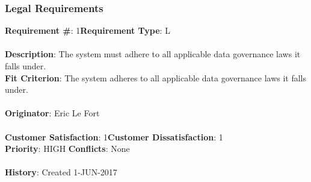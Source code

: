 \documentclass[titlepage]{article}
\begin{document}
\subsubsection{Legal Requirements}
\begin{framed}
	\noindent\textbf{Requirement \#}: 1\hfill \textbf{Requirement Type}: L\hfill\\\\
	\noindent\textbf{Description}: The system must adhere to all applicable data governance laws it falls under.\\
	\textbf{Fit Criterion}: The system adheres to all applicable data governance laws it falls under.\\\\
	\textbf{Originator}: Eric Le Fort\\\\
	\noindent\textbf{Customer Satisfaction}: 1\hfill \textbf{Customer Dissatisfaction}: 1\hfill\\
	\textbf{Priority}: HIGH \hfill \textbf{Conflicts}: None\hfill\\\\
	\noindent\textbf{History}: Created 1-JUN-2017
\end{framed}
\end{document}
